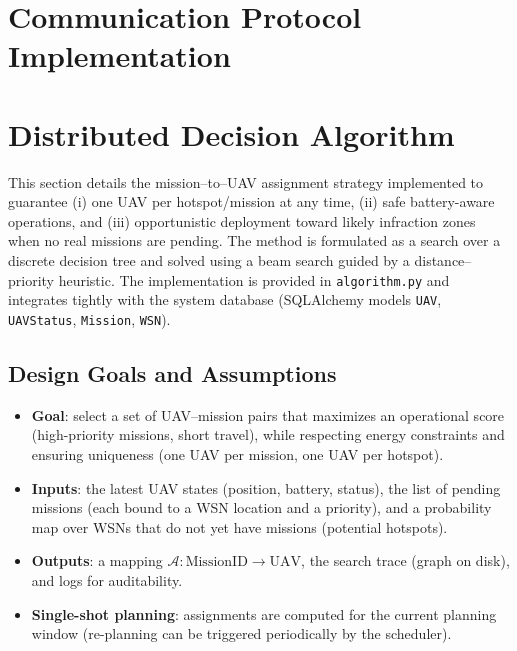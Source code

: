 \section{Communication Protocol Implementation}





\section{Distributed Decision Algorithm}

This section details the mission--to--UAV assignment strategy implemented to guarantee
(i) one UAV per hotspot/mission at any time, (ii) safe battery-aware operations, and
(iii) opportunistic deployment toward likely infraction zones when no real missions are pending.
The method is formulated as a search over a discrete decision tree and solved using a
beam search guided by a distance--priority heuristic. The implementation is provided in
\texttt{algorithm.py} and integrates tightly with the system database (SQLAlchemy models
\texttt{UAV}, \texttt{UAVStatus}, \texttt{Mission}, \texttt{WSN}).

\subsection*{Design Goals and Assumptions}
\begin{itemize}
  \item \textbf{Goal}: select a set of UAV--mission pairs that maximizes an operational score
        (high-priority missions, short travel), while respecting energy constraints and ensuring
        uniqueness (one UAV per mission, one UAV per hotspot).
  \item \textbf{Inputs}: the latest UAV states (position, battery, status), the list of pending missions
        (each bound to a WSN location and a priority), and a probability map over WSNs that do not
        yet have missions (potential hotspots).
  \item \textbf{Outputs}: a mapping \(\mathcal{A}: \text{MissionID} \rightarrow \text{UAV}\), the search trace
        (graph on disk), and logs for auditability.
  \item \textbf{Single-shot planning}: assignments are computed for the current planning window
        (re-planning can be triggered periodically by the scheduler).
\end{itemize}

